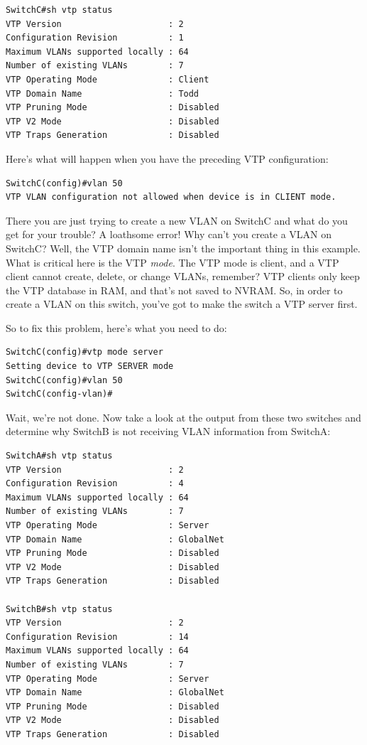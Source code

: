 \begin{verbatim}
SwitchC#sh vtp status
VTP Version                     : 2
Configuration Revision          : 1
Maximum VLANs supported locally : 64
Number of existing VLANs        : 7
VTP Operating Mode              : Client
VTP Domain Name                 : Todd
VTP Pruning Mode                : Disabled
VTP V2 Mode                     : Disabled
VTP Traps Generation            : Disabled
\end{verbatim}

Here's what will happen when you have the preceding VTP configuration:

\begin{verbatim}
SwitchC(config)#vlan 50
VTP VLAN configuration not allowed when device is in CLIENT mode.
\end{verbatim}

There you are just
trying to create a new VLAN on SwitchC and what do you get for your
trouble? A loathsome error! Why can't you create a VLAN on SwitchC?
Well, the VTP domain name isn't the important thing in this example.
What is critical here is the VTP \emph{mode}. The VTP mode is client,
and a VTP client cannot create, delete, or change VLANs, remember? VTP
clients only keep the VTP database in RAM, and that's not saved to
NVRAM. So, in order to create a VLAN on this switch, you've got to make
the switch a VTP server first.

So to fix this problem, here's what you need to do:

\begin{verbatim}
SwitchC(config)#vtp mode server
Setting device to VTP SERVER mode
SwitchC(config)#vlan 50
SwitchC(config-vlan)#
\end{verbatim}

Wait, we're not done. Now take a look at the output from these two
switches and determine why SwitchB is not receiving VLAN information
from SwitchA:

\begin{verbatim}
SwitchA#sh vtp status
VTP Version                     : 2
Configuration Revision          : 4
Maximum VLANs supported locally : 64
Number of existing VLANs        : 7
VTP Operating Mode              : Server
VTP Domain Name                 : GlobalNet
VTP Pruning Mode                : Disabled
VTP V2 Mode                     : Disabled
VTP Traps Generation            : Disabled
 
SwitchB#sh vtp status
VTP Version                     : 2
Configuration Revision          : 14
Maximum VLANs supported locally : 64
Number of existing VLANs        : 7
VTP Operating Mode              : Server
VTP Domain Name                 : GlobalNet
VTP Pruning Mode                : Disabled
VTP V2 Mode                     : Disabled
VTP Traps Generation            : Disabled
\end{verbatim}

